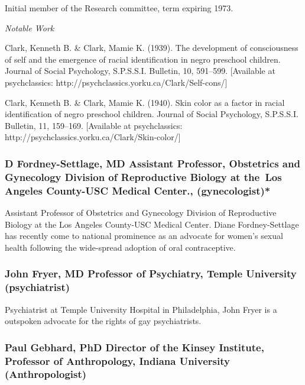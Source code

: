 Initial member of the Research committee, term expiring 1973.

\emph{Notable Work}

Clark, Kenneth B. \& Clark, Mamie K. (1939). The development of consciousness of self and the emergence of racial identification in negro preschool children. Journal of Social Psychology, S.P.S.S.I. Bulletin, 10, 591--599. [Available at psychclassics: http:\slash \slash psychclassics.yorku.ca\slash Clark\slash Self-cons\slash ]

Clark, Kenneth B. \& Clark, Mamie K. (1940). Skin color as a factor in racial identification of negro preschool children. Journal of Social Psychology, S.P.S.S.I. Bulletin, 11, 159--169. [Available at psychclassics: http:\slash \slash psychclassics.yorku.ca\slash Clark\slash Skin-color\slash ]

\subsubsection{D Fordney-Settlage, MD Assistant Professor, Obstetrics and Gynecology Division of Reproductive Biology at the Los Angeles County-USC Medical Center., (gynecologist)*}
\label{dfordney-settlagemdassistantprofessorobstetricsandgynecologydivisionofreproductivebiologyatthe losangelescounty-uscmedicalcenter.gynecologist}

Assistant Professor of Obstetrics and Gynecology Division of Reproductive Biology at the Los Angeles County-USC Medical Center. Diane Fordney-Settlage has recently come to national prominence as an advocate for women's sexual health following the wide-spread adoption of oral contraceptive.

\subsubsection{John Fryer, MD Professor of Psychiatry, Temple University (psychiatrist)}
\label{johnfryermdprofessorofpsychiatrytempleuniversitypsychiatrist}

Psychiatrist at Temple University Hospital in Philadelphia, John Fryer is a outspoken advocate for the rights of gay psychiatrists.

\subsubsection{Paul Gebhard, PhD Director of the Kinsey Institute, Professor of Anthropology, Indiana University (Anthropologist)}
\label{paulgebhardphddirectorofthekinseyinstituteprofessorofanthropologyindianauniversityanthropologist}

